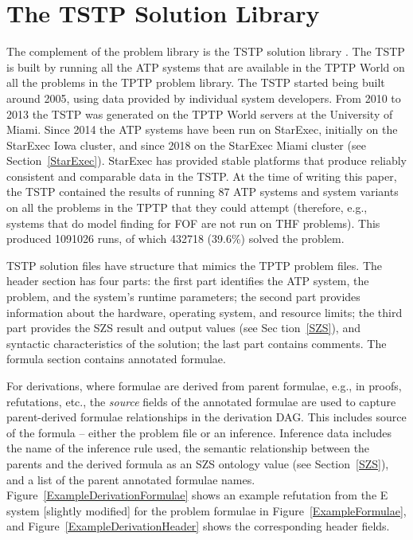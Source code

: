 \documentclass{easychair}
\begin{document}
\section{The TSTP Solution Library}
\label{TSTP}

The complement of the problem library is the TSTP solution library \cite{Sut07-CSR,Sut10}.
The TSTP is built by running all the ATP systems that are available in the TPTP World on
all the problems in the TPTP problem library.
The TSTP started being built around 2005, using data provided by individual system developers.
From 2010 to 2013 the TSTP was generated on the TPTP World servers at the University of Miami. 
Since 2014 the ATP systems have been run on StarExec, initially on the StarExec Iowa cluster, 
and since 2018 on the StarExec Miami cluster (see Section~\ref{StarExec}). 
StarExec has provided stable platforms that produce reliably consistent and comparable data in 
the TSTP.
At the time of writing this paper, the TSTP contained the results of running 87 ATP systems and 
system variants on all the problems in the TPTP that they could attempt
(therefore, e.g., systems that do model finding for FOF are not run on THF problems).
This produced 1091026 runs, of which 432718 (39.6\%) solved the problem.

TSTP solution files have structure that mimics the TPTP problem files.
The header section has four parts: 
the first part identifies the ATP system, the problem, and the system's runtime parameters; 
the second part provides information about the hardware, operating system, and resource limits; 
the third part provides the SZS result and output values (see Sec tion~\ref{SZS}), and syntactic 
characteristics of the solution; the last part contains comments.
The formula section contains annotated formulae. 

For derivations, where formulae are derived from parent formulae, e.g., in proofs, refutations, 
etc., the {\em source} fields of the annotated formulae are used to capture parent-derived 
formulae relationships in the derivation DAG.
This includes source of the formula -- either the problem file or an inference.
Inference data includes the name of the inference rule used, the semantic relationship between 
the parents and the derived formula as an SZS ontology value (see Section~\ref{SZS}), and a 
list of the parent annotated formulae names.
Figure~\ref{ExampleDerivationFormulae} shows an example refutation from the E system \cite{SCV19} 
[slightly modified] for the problem formulae in Figure~\ref{ExampleFormulae}, and 
Figure~\ref{ExampleDerivationHeader} shows the corresponding header fields.
\end{document}
